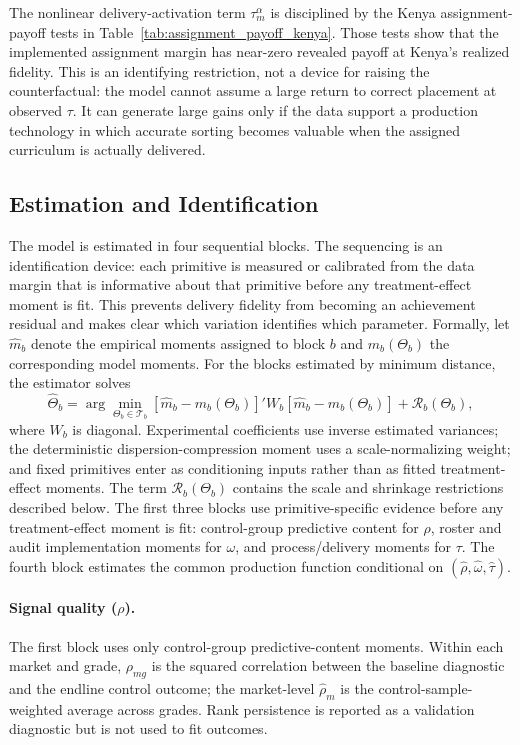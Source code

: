 \documentclass[11pt]{article}
\begin{document}
The nonlinear delivery-activation term $\tau_m^\alpha$ is disciplined by the Kenya assignment-payoff tests in Table~\ref{tab:assignment_payoff_kenya}. Those tests show that the implemented assignment margin has near-zero revealed payoff at Kenya's realized fidelity. This is an identifying restriction, not a device for raising the counterfactual: the model cannot assume a large return to correct placement at observed $\tau$. It can generate large gains only if the data support a production technology in which accurate sorting becomes valuable when the assigned curriculum is actually delivered.

\subsection{Estimation and Identification}
\label{subsec:struct_blocks}

The model is estimated in four sequential blocks. The sequencing is an identification device: each primitive is measured or calibrated from the data margin that is informative about that primitive before any treatment-effect moment is fit. This prevents delivery fidelity from becoming an achievement residual and makes clear which variation identifies which parameter. Formally, let $\hat{m}_b$ denote the empirical moments assigned to block $b$ and $m_b(\Theta_b)$ the corresponding model moments. For the blocks estimated by minimum distance, the estimator solves
\begin{equation}
\label{eq:md_objective}
\hat{\Theta}_b
= \arg\min_{\Theta_b \in \mathcal{T}_b}
\left[\hat{m}_b - m_b(\Theta_b)\right]'
W_b
\left[\hat{m}_b - m_b(\Theta_b)\right]
+ \mathcal{R}_b(\Theta_b),
\end{equation}
where $W_b$ is diagonal. Experimental coefficients use inverse estimated variances; the deterministic dispersion-compression moment uses a scale-normalizing weight; and fixed primitives enter as conditioning inputs rather than as fitted treatment-effect moments. The term $\mathcal{R}_b(\Theta_b)$ contains the scale and shrinkage restrictions described below. The first three blocks use primitive-specific evidence before any treatment-effect moment is fit: control-group predictive content for $\rho$, roster and audit implementation moments for $\omega$, and process/delivery moments for $\tau$. The fourth block estimates the common production function conditional on $(\hat{\rho},\hat{\omega},\hat{\tau})$.

\paragraph{Signal quality ($\rho$).} The first block uses only control-group predictive-content moments. Within each market and grade, $\rho_{mg}$ is the squared correlation between the baseline diagnostic and the endline control outcome; the market-level $\hat{\rho}_m$ is the control-sample-weighted average across grades. Rank persistence is reported as a validation diagnostic but is not used to fit outcomes.
\end{document}
